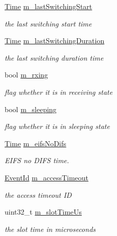 \begin{DoxyCompactItemize}
\hyperlink{classns3_1_1Time}{Time} \hyperlink{classns3_1_1DcfManager_afdb592d5f09af096f13c275834e16516}{m\+\_\+last\+Switching\+Start}
\begin{DoxyCompactList}\small\item\em the last switching start time \end{DoxyCompactList}\item 
\hyperlink{classns3_1_1Time}{Time} \hyperlink{classns3_1_1DcfManager_addb6585ae1360770ff609e7b944cbbf7}{m\+\_\+last\+Switching\+Duration}
\begin{DoxyCompactList}\small\item\em the last switching duration time \end{DoxyCompactList}\item 
bool \hyperlink{classns3_1_1DcfManager_a4826eeefd00a05de3377987c4ce71969}{m\+\_\+rxing}
\begin{DoxyCompactList}\small\item\em flag whether it is in receiving state \end{DoxyCompactList}\item 
bool \hyperlink{classns3_1_1DcfManager_aafbdf9bb6a0edaab12b82b6efa42ee93}{m\+\_\+sleeping}
\begin{DoxyCompactList}\small\item\em flag whether it is in sleeping state \end{DoxyCompactList}\item 
\hyperlink{classns3_1_1Time}{Time} \hyperlink{classns3_1_1DcfManager_a9bf83a117ac175213dd7776c335d5523}{m\+\_\+eifs\+No\+Difs}
\begin{DoxyCompactList}\small\item\em E\+I\+FS no D\+I\+FS time. \end{DoxyCompactList}\item 
\hyperlink{classns3_1_1EventId}{Event\+Id} \hyperlink{classns3_1_1DcfManager_aa14d379408c9430ab07539536ab8d72e}{m\+\_\+access\+Timeout}
\begin{DoxyCompactList}\small\item\em the access timeout ID \end{DoxyCompactList}\item 
uint32\+\_\+t \hyperlink{classns3_1_1DcfManager_adab37a3d40ff8e7afe578f5d1fde7ba3}{m\+\_\+slot\+Time\+Us}
\begin{DoxyCompactList}\small\item\em the slot time in microseconds \end{DoxyCompactList}\item 

\end{DoxyCompactItemize}
